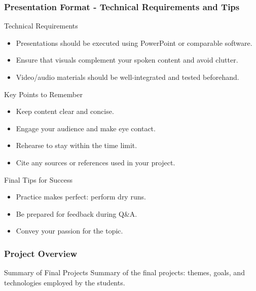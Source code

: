 \documentclass[aspectratio=169]{beamer}
\begin{document}
\begin{frame}[fragile]
    \frametitle{Presentation Format - Technical Requirements and Tips}
    \begin{block}{Technical Requirements}
        \begin{itemize}
            \item Presentations should be executed using PowerPoint or comparable software.
            \item Ensure that visuals complement your spoken content and avoid clutter.
            \item Video/audio materials should be well-integrated and tested beforehand.
        \end{itemize}
    \end{block}
    
    \begin{block}{Key Points to Remember}
        \begin{itemize}
            \item Keep content clear and concise.
            \item Engage your audience and make eye contact.
            \item Rehearse to stay within the time limit.
            \item Cite any sources or references used in your project.
        \end{itemize}
    \end{block}
    
    \begin{block}{Final Tips for Success}
        \begin{itemize}
            \item Practice makes perfect: perform dry runs.
            \item Be prepared for feedback during Q\&A.
            \item Convey your passion for the topic.
        \end{itemize}
    \end{block}
\end{frame}

\begin{frame}[fragile]
    \frametitle{Project Overview}
    \begin{block}{Summary of Final Projects}
        Summary of the final projects: themes, goals, and technologies employed by the students.
    \end{block}
\end{frame}
\end{document}

